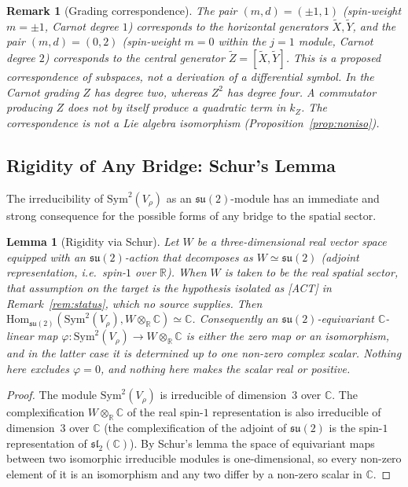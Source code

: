 \documentclass[11pt,a4paper]{article}
\newtheorem{lemma}[theorem]{Lemma}
\newtheorem{remark}[theorem]{Remark}
\newcommand{\su}{\mathfrak{su}}
\newcommand{\Vr}{V_\rho}
\newcommand{\Sym}{\mathrm{Sym}}
\begin{document}
    \begin{remark}[Grading correspondence]
      \label{rem:grading}
      The pair $(m, d) = (\pm 1, 1)$ (spin-weight $m = \pm 1$, Carnot degree $1$) corresponds to the
      horizontal generators $\tilde X, \tilde Y$, and the pair $(m, d) = (0, 2)$
      (spin-weight $m = 0$ within the $j = 1$ module, Carnot degree $2$) corresponds to the central
      generator $\tilde Z = [\tilde X, \tilde Y]$.
      This is a proposed correspondence of subspaces, not a derivation of a differential symbol.
      In the Carnot grading $Z$ has degree two, whereas $Z^2$ has degree four.
      A commutator producing $Z$ does not by itself produce a quadratic term in $k_Z$.
      The correspondence is not a Lie algebra isomorphism (Proposition~\ref{prop:noniso}).
    \end{remark}

  \subsection{Rigidity of Any Bridge: Schur's Lemma}
    \label{sec:schur}

    The irreducibility of $\Sym^2(\Vr)$ as an $\su(2)$-module has an immediate and strong consequence
    for the possible forms of any bridge to the spatial sector.

    \begin{lemma}[Rigidity via Schur]
      \label{lem:schur}
      Let $W$ be a three-dimensional real vector space equipped with an $\su(2)$-action that decomposes
      as $W \simeq \mathfrak{su}(2)$ (adjoint representation, i.e.\ spin-$1$ over $\mathbb{R}$).
      When $W$ is taken to be the real spatial sector, that assumption on the target is the
      hypothesis isolated as [ACT] in Remark~\ref{rem:status}, which no source supplies.
      Then $\mathrm{Hom}_{\su(2)}(\Sym^2(\Vr), W \otimes_\mathbb{R} \mathbb{C}) \simeq \mathbb{C}$.
      Consequently an $\su(2)$-equivariant $\mathbb{C}$-linear map
      $\varphi : \Sym^2(\Vr) \to W \otimes_\mathbb{R} \mathbb{C}$ is either the zero map or an
      isomorphism, and in the latter case it is determined up to one non-zero complex scalar.
      Nothing here excludes $\varphi = 0$, and nothing here makes the scalar real or positive.
    \end{lemma}

    \begin{proof}
      The module $\Sym^2(\Vr)$ is irreducible of dimension~$3$ over $\mathbb{C}$.
      The complexification $W \otimes_\mathbb{R} \mathbb{C}$ of the real spin-$1$ representation is
      also irreducible of dimension~$3$ over $\mathbb{C}$ (the complexification of the adjoint
      of $\su(2)$ is the spin-$1$ representation of $\mathfrak{sl}_2(\mathbb{C})$).
      By Schur's lemma the space of equivariant maps between two isomorphic irreducible modules is
      one-dimensional, so every non-zero element of it is an isomorphism and any two differ by a
      non-zero scalar in $\mathbb{C}$.
    \end{proof}
\end{document}
